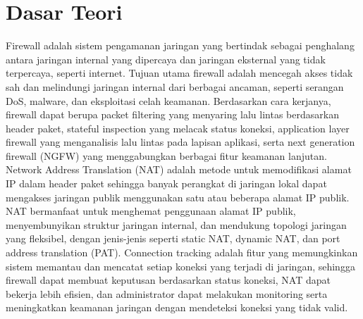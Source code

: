 \section{Dasar Teori}
Firewall adalah sistem pengamanan jaringan yang bertindak sebagai penghalang antara jaringan internal yang dipercaya dan jaringan eksternal yang tidak terpercaya, seperti internet. Tujuan utama firewall adalah mencegah akses tidak sah dan melindungi jaringan internal dari berbagai ancaman, seperti serangan DoS, malware, dan eksploitasi celah keamanan. Berdasarkan cara kerjanya, firewall dapat berupa packet filtering yang menyaring lalu lintas berdasarkan header paket, stateful inspection yang melacak status koneksi, application layer firewall yang menganalisis lalu lintas pada lapisan aplikasi, serta next generation firewall (NGFW) yang menggabungkan berbagai fitur keamanan lanjutan. Network Address Translation (NAT) adalah metode untuk memodifikasi alamat IP dalam header paket sehingga banyak perangkat di jaringan lokal dapat mengakses jaringan publik menggunakan satu atau beberapa alamat IP publik. NAT bermanfaat untuk menghemat penggunaan alamat IP publik, menyembunyikan struktur jaringan internal, dan mendukung topologi jaringan yang fleksibel, dengan jenis-jenis seperti static NAT, dynamic NAT, dan port address translation (PAT). Connection tracking adalah fitur yang memungkinkan sistem memantau dan mencatat setiap koneksi yang terjadi di jaringan, sehingga firewall dapat membuat keputusan berdasarkan status koneksi, NAT dapat bekerja lebih efisien, dan administrator dapat melakukan monitoring serta meningkatkan keamanan jaringan dengan mendeteksi koneksi yang tidak valid.


